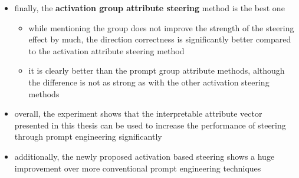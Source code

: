 \begin{itemize}
\begin{itemize}
        \end{itemize}
  \item finally, the \textbf{activation group attribute steering} method is the best one
        \begin{itemize}
          \item while mentioning the group does not improve the strength of the steering effect by much, the direction correctness is significantly better compared to the activation attribute steering method
          \item it is clearly better than the prompt group attribute methods, although the difference is not as strong as with the other activation steering methods
        \end{itemize}

  \item overall, the experiment shows that the interpretable attribute vector presented in this thesis can be used to increase the performance of steering through prompt engineering significantly
  \item additionally, the newly proposed activation based steering shows a huge improvement over more conventional prompt engineering techniques
\end{itemize}



